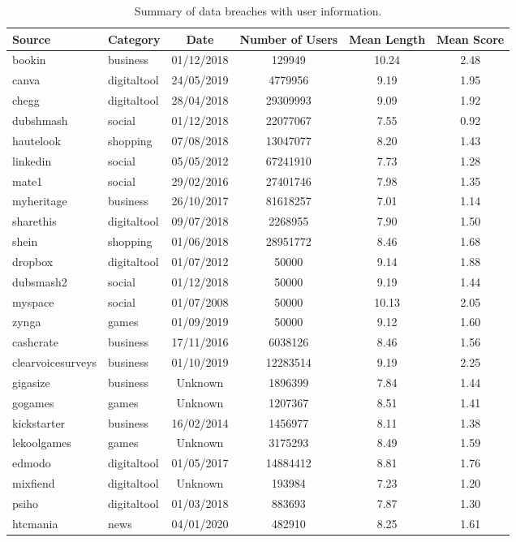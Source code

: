 \begin{table*}[h!]
\centering
\begin{tabular}{|l|l|c|c|c|c|}
\hline
\textbf{Source} & \textbf{Category} & \textbf{Date} & \textbf{Number of Users} & \textbf{Mean Length} & \textbf{Mean Score} \\
\hline
bookin & business & 01/12/2018  & 129949 & 10.24 & 2.48 \\
canva & digitaltool & 24/05/2019  & 4779956 & 9.19 & 1.95 \\
chegg & digitaltool & 28/04/2018  & 29309993 & 9.09 & 1.92 \\
dubshmash & social & 01/12/2018  & 22077067 & 7.55 & 0.92 \\
hautelook & shopping & 07/08/2018  & 13047077 & 8.20 & 1.43 \\
linkedin & social & 05/05/2012  & 67241910 & 7.73 & 1.28 \\
mate1 & social & 29/02/2016  & 27401746 & 7.98 & 1.35 \\
myheritage & business & 26/10/2017  & 81618257 & 7.01 & 1.14 \\
sharethis & digitaltool & 09/07/2018  & 2268955 & 7.90 & 1.50 \\
shein & shopping & 01/06/2018  & 28951772 & 8.46 & 1.68 \\
dropbox & digitaltool & 01/07/2012  & 50000 & 9.14 & 1.88 \\
dubsmash2 & social & 01/12/2018  & 50000 & 9.19 & 1.44 \\
myspace & social & 01/07/2008  & 50000 & 10.13 & 2.05 \\
zynga & games & 01/09/2019  & 50000 & 9.12 & 1.60 \\
cashcrate & business & 17/11/2016  & 6038126 & 8.46 & 1.56 \\
clearvoicesurveys & business & 01/10/2019  & 12283514 & 9.19 & 2.25 \\
gigasize & business & Unknown  & 1896399 & 7.84 & 1.44 \\
gogames & games & Unknown  & 1207367 & 8.51 & 1.41 \\
kickstarter & business & 16/02/2014  & 1456977 & 8.11 & 1.38 \\
lekoolgames & games & Unknown  & 3175293 & 8.49 & 1.59 \\
edmodo & digitaltool & 01/05/2017  & 14884412 & 8.81 & 1.76 \\
mixfiend & digitaltool & Unknown  & 193984 & 7.23 & 1.20 \\
psiho & digitaltool & 01/03/2018  & 883693 & 7.87 & 1.30 \\
htcmania & news & 04/01/2020  & 482910 & 8.25 & 1.61 \\
\hline
\end{tabular}
\caption{Summary of data breaches with user information.}
\end{table*}
